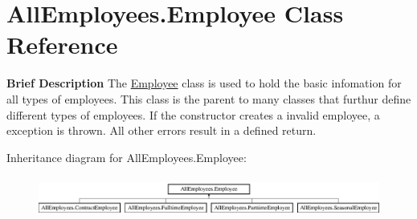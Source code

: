 \hypertarget{class_all_employees_1_1_employee}{}\section{All\+Employees.\+Employee Class Reference}
\label{class_all_employees_1_1_employee}


{\bfseries Brief Description} The \hyperlink{class_all_employees_1_1_employee}{Employee} class is used to hold the basic infomation for all types of employees. This class is the parent to many classes that furthur define different types of employees. If the constructor creates a invalid employee, a exception is thrown. All other errors result in a defined return.  


Inheritance diagram for All\+Employees.\+Employee\+:\begin{figure}[H]
\begin{center}
\leavevmode
\includegraphics[height=1.352657cm]{class_all_employees_1_1_employee}
\end{center}
\end{figure}
